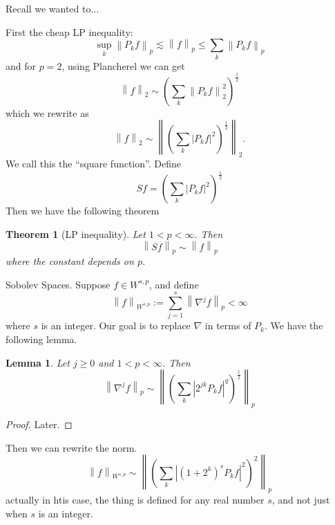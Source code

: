 \documentclass{article}
\newtheorem{theorem}{Theorem}
\newtheorem{lemma}{Lemma}
\newcommand\norm[1]{\left\lVert#1\right\rVert}
\begin{document}
Recall we wanted to...

First the cheap LP inequality:
\begin{equation*}
  \sup_{k} \norm{P_{k}f}_{p} \lesssim \norm{f}_{p} \leq \sum_{k} \norm{P_{k}f}_{p} 
\end{equation*}
and for $p=2$, using Plancherel we can get
\begin{equation*}
  \norm{f}_{2} \sim \left( \sum_{k}\norm{P_{k}f}_{2}^{2}  \right)^{\frac{1}{2}} 
\end{equation*}
which we rewrite as
\begin{equation*}
  \norm{f}_{2} \sim \norm{\left( \sum_{k}\left| P_{k}f \right|^{2} \right)^{\frac{1}{2}} }_{2}.
\end{equation*}
We call this the ``square function''. Define
\begin{equation*}
  Sf = \left( \sum_{k} \left| P_{k}f \right|^{2} \right)^{\frac{1}{2}}
\end{equation*}
Then we have the following theorem
\begin{theorem}[LP inequality]
  Let $1<p<\infty$. Then
  \begin{equation*}
    \norm{Sf}_{p}\sim \norm{f}_{p}
  \end{equation*}
  where the constant depends on $p$. 
\end{theorem}
Sobolev Spaces. Suppose $f\in W^{s,p}$, and define
\begin{equation*}
  \norm{f}_{W^{s,p}}:= \sum_{j=1}^{s} \norm{\nabla^{j}f}_{p}<\infty 
\end{equation*}
where $s$ is an integer. Our goal is to replace $\nabla$ in terms of $P_{k}$.
We have the following lemma.

\begin{lemma}
  Let $j \geq 0$ and $1<p<\infty$. Then
  \begin{equation*}
    \norm{\nabla^{j}f}_{p} \sim \norm{\left( \sum_{k} \left| 2^{jk}P_{k}f \right|^{q} \right)^{\frac{1}{2}} }_{p}
  \end{equation*}
\end{lemma}
\begin{proof}
  Later.
\end{proof}

Then we can rewrite the norm.
\begin{equation*}
  \norm{f}_{W^{s,p}}\sim \norm{ \left(  \sum_{k}\left| (1+2^{k})^{s}P_{k}f \right|^{2} \right)^{2} }_{p}
\end{equation*}
actually in htis case, the thing is defined for any real number $s$, and not
just when $s$  is an integer. 
\end{document}

